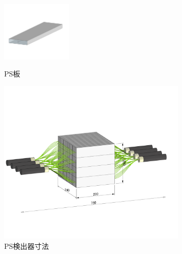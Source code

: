   \begin{figure}[H]
        \centering
        \includegraphics[width=0.3\textwidth]{figure/hayakawa/psmd.png}
        \caption{PS板}
        \centering
        \includegraphics[width=0.8\textwidth]{figure/hayakawa/p7.png}
        \caption{PS検出器寸法}
        \label{PS_sunpou}
  \end{figure}

